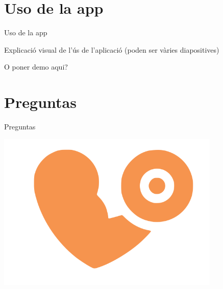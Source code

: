\documentclass[12pt]{beamer}
\begin{document}
\section{Uso de la app}
\begin{frame}{Uso de la app}

\begin{center}
Explicació visual de l'ús de l'aplicació (poden ser vàries diapositives)

O poner demo aqui?
\end{center}


\end{frame}

\section{Preguntas}
\begin{frame}{Preguntas}

\begin{center}
\includegraphics[width=0.8\textwidth]{gymodo_logo}
\end{center}


\end{frame}
\end{document}
